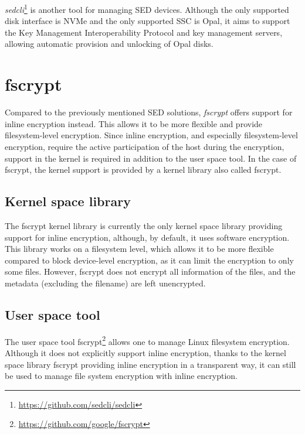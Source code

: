 \emph{sedcli}\footnote{\url{https://github.com/sedcli/sedcli}} is another tool for managing SED devices. Although the only supported disk interface is NVMe and the only supported SSC is Opal, it aims to support the Key Management Interoperability Protocol and key management servers, allowing automatic provision and unlocking of Opal disks.


\section{fscrypt}

Compared to the previously mentioned SED solutions, \emph{fscrypt} offers support for inline encryption instead. This allows it to be more flexible and provide filesystem-level encryption.
Since inline encryption, and especially filesystem-level encryption, require the active participation of the host during the encryption, support in the kernel is required in addition to the user space tool.
In the case of fscrypt, the kernel support is provided by a kernel library also called fscrypt.


\subsection{Kernel space library}

The fscrypt kernel library is currently the only kernel space library providing support for inline encryption, although, by default, it uses software encryption.
This library works on a filesystem level, which allows it to be more flexible compared to block device-level encryption, as it can limit the encryption to only some files. However, fscrypt does not encrypt all information of the files, and the metadata (excluding the filename) are left unencrypted.



\subsection{User space tool}

The user space tool fscrypt\footnote{\url{https://github.com/google/fscrypt}} allows one to manage Linux filesystem encryption. Although it does not explicitly support inline encryption, thanks to the kernel space library fscrypt providing inline encryption in a transparent way, it can still be used to manage file system encryption with inline encryption.



